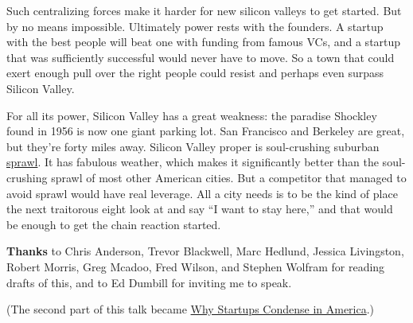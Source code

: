 Such centralizing forces make it harder for new silicon valleys to get
started. But by no means impossible. Ultimately power rests with the
founders. A startup with the best people will beat one with funding from
famous VCs, and a startup that was sufficiently successful would never
have to move. So a town that could exert enough pull over the right
people could resist and perhaps even surpass Silicon Valley.

For all its power, Silicon Valley has a great weakness: the paradise
Shockley found in 1956 is now one giant parking lot. San Francisco and
Berkeley are great, but they're forty miles away. Silicon Valley proper
is soul-crushing suburban
\href{http://www.flickr.com/photos/caterina/34637/}{sprawl}. It has
fabulous weather, which makes it significantly better than the
soul-crushing sprawl of most other American cities. But a competitor
that managed to avoid sprawl would have real leverage. All a city needs
is to be the kind of place the next traitorous eight look at and say ``I
want to stay here,'' and that would be enough to get the chain reaction
started.


\textbf{Thanks} to Chris Anderson, Trevor Blackwell, Marc Hedlund,
Jessica Livingston, Robert Morris, Greg Mcadoo, Fred Wilson, and Stephen
Wolfram for reading drafts of this, and to Ed Dumbill for inviting me to
speak.

(The second part of this talk became \href{america.html}{Why Startups
Condense in America}.)